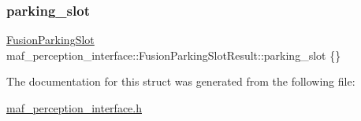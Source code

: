 \subsubsection{\texorpdfstring{parking\+\_\+slot}{parking\_slot}}
{\footnotesize\ttfamily \hyperlink{structmaf__perception__interface_1_1FusionParkingSlot}{Fusion\+Parking\+Slot} maf\+\_\+perception\+\_\+interface\+::\+Fusion\+Parking\+Slot\+Result\+::parking\+\_\+slot \{\}}



The documentation for this struct was generated from the following file\+:\begin{DoxyCompactItemize}
\item 
\hyperlink{maf__perception__interface_8h}{maf\+\_\+perception\+\_\+interface.\+h}\end{DoxyCompactItemize}
